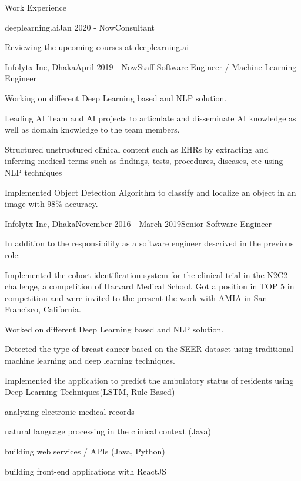 \documentclass{resume} %
\begin{document}
\begin{rSection}{Work Experience}
\begin{rSubsection}{deeplearning.ai}{Jan 2020 - Now}{Consultant}{}
\item Reviewing the upcoming courses at deeplearning.ai 
\end{rSubsection}

\begin{rSubsection}{Infolytx Inc, Dhaka}{April 2019 - Now}{Staff Software Engineer / Machine Learning Engineer }{}
\item Working on different Deep Learning based and NLP solution. 
\item Leading AI Team and AI projects to articulate and disseminate AI knowledge as well as domain knowledge to the team members.
\item Structured unstructured clinical content such as EHRs by extracting and inferring medical terms such as findings, tests, procedures, diseases, etc using NLP techniques
\item Implemented Object Detection Algorithm to classify and localize an object in an image with 98\% accuracy.
\end{rSubsection}

\begin{rSubsection}{Infolytx Inc, Dhaka}{November 2016 - March 2019}{Senior Software Engineer}{}
\item 
In addition to the responsibility as a software engineer descrived in the previous role:

\item Implemented the cohort identification system for the clinical trial in the N2C2 challenge, a competition of Harvard Medical School.  Got a position in TOP 5 in competition and were invited to the present the work with AMIA in San Francisco, California.
\item Worked on different Deep Learning based and NLP solution. 
\item Detected the type of breast cancer based on the SEER dataset using traditional machine learning and deep learning techniques.
\item Implemented  the application to predict the ambulatory status of residents using Deep Learning Techniques(LSTM, Rule-Based) 
\item analyzing electronic medical records
\item natural language processing in the clinical context (Java)
\item building web services / APIs (Java, Python)
\item building front-end applications with ReactJS


\end{rSubsection}
\end{rSection}
\end{document}
